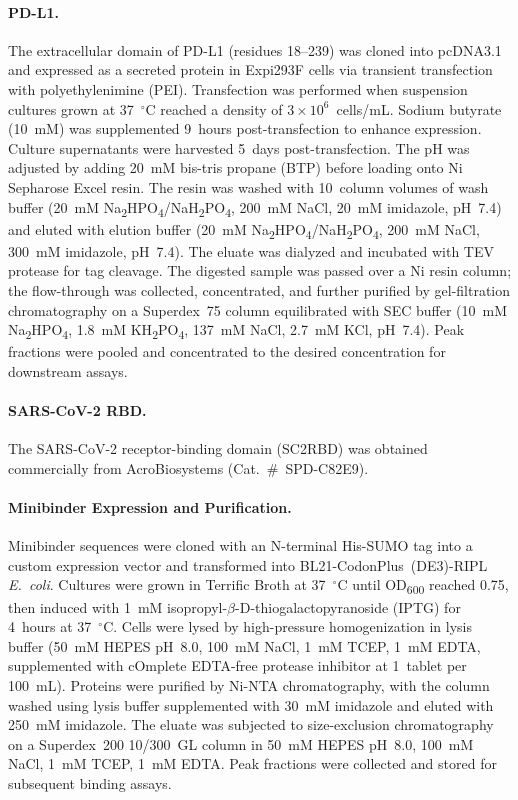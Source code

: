 \documentclass[]{bytedance_seed}
\begin{document}
\paragraph{PD-L1.}
The extracellular domain of PD-L1 (residues 18--239) was cloned into pcDNA3.1 and expressed as a secreted protein in Expi293F cells via transient transfection with polyethylenimine (PEI). Transfection was performed when suspension cultures grown at 37~$^\circ$C reached a density of $3 \times 10^6$~cells/mL. Sodium butyrate (10~mM) was supplemented 9~hours post-transfection to enhance expression. Culture supernatants were harvested 5~days post-transfection. The pH was adjusted by adding 20~mM bis-tris propane (BTP) before loading onto Ni Sepharose Excel resin. The resin was washed with 10~column volumes of wash buffer (20~mM Na\textsubscript{2}HPO\textsubscript{4}/NaH\textsubscript{2}PO\textsubscript{4}, 200~mM NaCl, 20~mM imidazole, pH~7.4) and eluted with elution buffer (20~mM Na\textsubscript{2}HPO\textsubscript{4}/NaH\textsubscript{2}PO\textsubscript{4}, 200~mM NaCl, 300~mM imidazole, pH~7.4). The eluate was dialyzed and incubated with TEV protease for tag cleavage. The digested sample was passed over a Ni resin column; the flow-through was collected, concentrated, and further purified by gel-filtration chromatography on a Superdex~75 column equilibrated with SEC buffer (10~mM Na\textsubscript{2}HPO\textsubscript{4}, 1.8~mM KH\textsubscript{2}PO\textsubscript{4}, 137~mM NaCl, 2.7~mM KCl, pH~7.4). Peak fractions were pooled and concentrated to the desired concentration for downstream assays.

\paragraph{SARS-CoV-2 RBD.}
The SARS-CoV-2 receptor-binding domain (SC2RBD) was obtained commercially from AcroBiosystems (Cat.~\#~SPD-C82E9).

\paragraph{Minibinder Expression and Purification.}
Minibinder sequences were cloned with an N-terminal His-SUMO tag into a custom expression vector and transformed into BL21-CodonPlus~(DE3)-RIPL \textit{E.~coli}. Cultures were grown in Terrific Broth at 37~$^\circ$C until OD\textsubscript{600} reached 0.75, then induced with 1~mM isopropyl-$\beta$-D-thiogalactopyranoside (IPTG) for 4~hours at 37~$^\circ$C. Cells were lysed by high-pressure homogenization in lysis buffer (50~mM HEPES pH~8.0, 100~mM NaCl, 1~mM TCEP, 1~mM EDTA, supplemented with cOmplete EDTA-free protease inhibitor at 1~tablet per 100~mL). Proteins were purified by Ni-NTA chromatography, with the column washed using lysis buffer supplemented with 30~mM imidazole and eluted with 250~mM imidazole. The eluate was subjected to size-exclusion chromatography on a Superdex~200 10/300~GL column in 50~mM HEPES pH~8.0, 100~mM NaCl, 1~mM TCEP, 1~mM EDTA. Peak fractions were collected and stored for subsequent binding assays.
\end{document}
